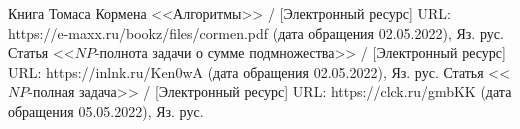 \documentclass[bachelor, och, labwork]{shiza}
\begin{document}
  

  




  
  



  \begin{thebibliography}{3}
    Книга Томаса Кормена <<Алгоритмы>> / [Электронный ресурс] URL: https://e-maxx.ru/bookz/files/cormen.pdf (дата обращения 02.05.2022), Яз. рус.
    Статья <<$NP$-полнота задачи о сумме подмножества>> / [Электронный ресурс] URL: https://inlnk.ru/Ken0wA (дата обращения 02.05.2022), Яз. рус.
    Статья <<$NP$-полная задача>> / [Электронный ресурс] URL: https://clck.ru/gmbKK (дата обращения 05.05.2022), Яз. рус.
  \end{thebibliography}
\end{document}
